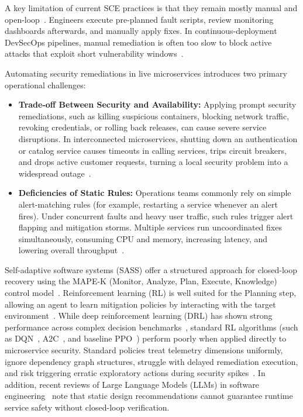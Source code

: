 \documentclass[ASNA,twocolumn]{USG}
\begin{document}
A key limitation of current SCE practices is that they remain mostly manual and open-loop~\cite{owotogbe2025chaos, shortridge2023security}. Engineers execute pre-planned fault scripts, review monitoring dashboards afterwards, and manually apply fixes. In continuous-deployment DevSecOps pipelines, manual remediation is often too slow to block active attacks that exploit short vulnerability windows~\cite{shortridge2023security, liu2025autonomous}.

Automating security remediations in live microservices introduces two primary operational challenges:
\begin{itemize}
    \item \textbf{Trade-off Between Security and Availability:} Applying prompt security remediations, such as killing suspicious containers, blocking network traffic, revoking credentials, or rolling back releases, can cause severe service disruptions. In interconnected microservices, shutting down an authentication or catalog service causes timeouts in calling services, trips circuit breakers, and drops active customer requests, turning a local security problem into a widespread outage~\cite{aderaldo2025declarative, schneider2015survey}.
    \item \textbf{Deficiencies of Static Rules:} Operations teams commonly rely on simple alert-matching rules (for example, restarting a service whenever an alert fires). Under concurrent faults and heavy user traffic, such rules trigger alert flapping and mitigation storms. Multiple services run uncoordinated fixes simultaneously, consuming CPU and memory, increasing latency, and lowering overall throughput~\cite{schneider2015survey}.
\end{itemize}

Self-adaptive software systems (SASS) offer a structured approach for closed-loop recovery using the MAPE-K (Monitor, Analyze, Plan, Execute, Knowledge) control model~\cite{salehie2009self, garlan2004rainbow, schneider2015survey}. Reinforcement learning (RL) is well suited for the Planning step, allowing an agent to learn mitigation policies by interacting with the target environment~\cite{sutton1998reinforcement, mnih2015human}. While deep reinforcement learning (DRL) has shown strong performance across complex decision benchmarks~\cite{silver2016mastering, mnih2016asynchronous, towers2026gymnasium, raffin2021stable}, standard RL algorithms (such as DQN~\cite{mnih2015human}, A2C~\cite{mnih2016asynchronous}, and baseline PPO~\cite{schulman2017ppo}) perform poorly when applied directly to microservice security. Standard policies treat telemetry dimensions uniformly, ignore dependency graph structures, struggle with delayed remediation execution, and risk triggering erratic exploratory actions during security spikes~\cite{zheng2025proximal, standen2021cyborg, nguyen2021deep, xiao2018iot}. In addition, recent reviews of Large Language Models (LLMs) in software engineering~\cite{hou2024large} note that static design recommendations cannot guarantee runtime service safety without closed-loop verification.
\end{document}
